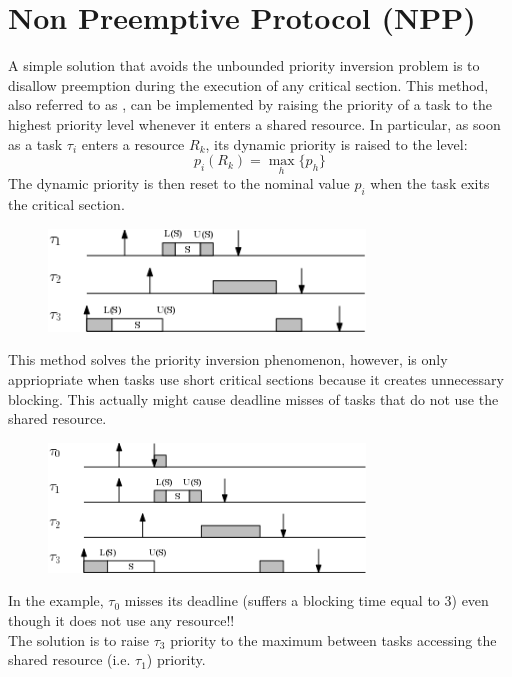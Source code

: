\section{Non Preemptive Protocol (NPP)} 
A simple solution that avoids the unbounded priority inversion problem is to disallow preemption during the execution of any critical section. This method, also referred to as , can be implemented by raising the priority of a task to the highest priority level whenever it enters a shared resource. In particular, as soon as a task $\tau_i$ enters a resource $R_k$, its dynamic priority is raised to the level:
\[p_i(R_k) = \max_h \{p_h\}\]
The dynamic priority is then reset to the nominal value $p_i$ when the task exits the critical section.

\begin{figure}[!h]
    \centering
    \includegraphics[width =0.75\textwidth]{images/image06.png}
\end{figure}


This method solves the priority inversion phenomenon, however, is only appriopriate when tasks use short critical sections because it creates unnecessary blocking. This actually might cause deadline misses of tasks that do not use the shared resource.

\begin{figure}[!h]
    \centering
    \includegraphics[width =0.75\textwidth]{images/image07.png}
\end{figure}
In the example, $\tau_0$ misses its deadline (suffers a blocking time equal to 3) even though it does not use any resource!!\\
The solution is to raise $\tau_3$ priority to the maximum between tasks accessing the shared resource (i.e. $\tau_1$) priority.

